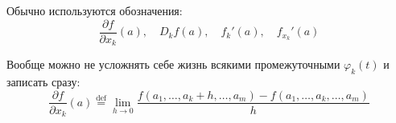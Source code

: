 \documentclass[../main.tex]{subfiles}
\begin{document}
Обычно используются обозначения:
\begin{equation*}
    \frac{\partial f}{\partial x_k}(a), \quad D_k f(a), \quad f_k'(a), \quad f_{x_k}'(a)
\end{equation*}

Вообще можно не усложнять себе жизнь всякими промежуточными $\varphi_k(t)$ и записать сразу:
\begin{equation*}
    \frac{\partial f}{\partial x_k}(a)\overset{\text{def}}{=}
    \lim_{h \to 0}\frac{f(a_1, \dots, a_k + h, \dots, a_m)-f(a_1, \dots, a_k, \dots, a_m)}{h}
\end{equation*}
\newpage
\end{document}
